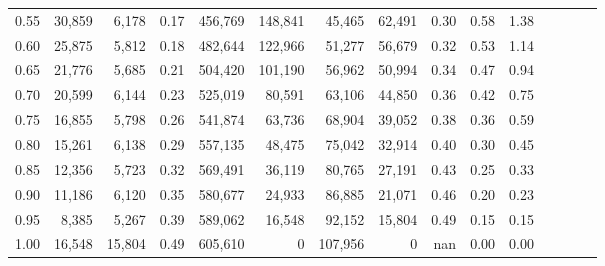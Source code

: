 \begin{tabular}{rrrcrrrrrrrrrrr}
0.55 &  30,859 &   6,178 &                                       0.17 &  456,769 &  148,841 &   45,465 &   62,491 &  0.30 &  0.58 &                         1.38 \\
0.60 &  25,875 &   5,812 &                                       0.18 &  482,644 &  122,966 &   51,277 &   56,679 &  0.32 &  0.53 &                         1.14 \\
0.65 &  21,776 &   5,685 &                                       0.21 &  504,420 &  101,190 &   56,962 &   50,994 &  0.34 &  0.47 &                         0.94 \\
0.70 &  20,599 &   6,144 &                                       0.23 &  525,019 &   80,591 &   63,106 &   44,850 &  0.36 &  0.42 &                         0.75 \\
0.75 &  16,855 &   5,798 &                                       0.26 &  541,874 &   63,736 &   68,904 &   39,052 &  0.38 &  0.36 &                         0.59 \\
0.80 &  15,261 &   6,138 &                                       0.29 &  557,135 &   48,475 &   75,042 &   32,914 &  0.40 &  0.30 &                         0.45 \\
0.85 &  12,356 &   5,723 &                                       0.32 &  569,491 &   36,119 &   80,765 &   27,191 &  0.43 &  0.25 &                         0.33 \\
0.90 &  11,186 &   6,120 &                                       0.35 &  580,677 &   24,933 &   86,885 &   21,071 &  0.46 &  0.20 &                         0.23 \\
0.95 &   8,385 &   5,267 &                                       0.39 &  589,062 &   16,548 &   92,152 &   15,804 &  0.49 &  0.15 &                         0.15 \\
1.00 &  16,548 &  15,804 &                                       0.49 &  605,610 &        0 &  107,956 &        0 &   nan &  0.00 &                         0.00 \\
\bottomrule
\end{tabular}

